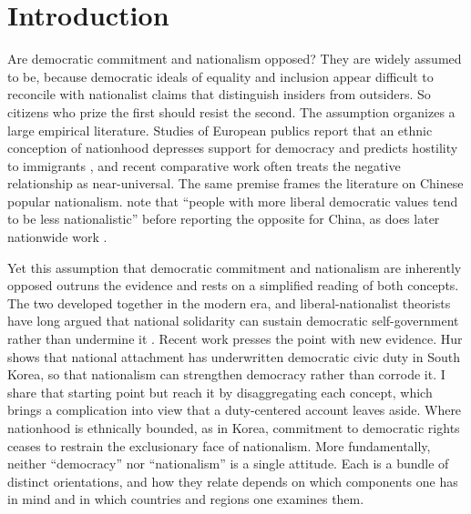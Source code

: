 \section{Introduction}\label{introduction}

Are democratic commitment and nationalism opposed? They are widely assumed to be, because democratic ideals of equality and inclusion appear difficult to reconcile with nationalist claims that distinguish insiders from outsiders. So citizens who prize the first should resist the second. The assumption organizes a large empirical literature. Studies of European publics report that an ethnic conception of nationhood depresses support for democracy \citep{gabrielsson2025} and predicts hostility to immigrants \citep{hjerm1998, pehrson2009}, and recent comparative work often treats the negative relationship as near-universal. The same premise frames the literature on Chinese popular nationalism. \citet[p.~62]{zhong2020} note that ``people with more liberal democratic values tend to be less nationalistic'' before reporting the opposite for China, as does later nationwide work \citep{liu2026}.

Yet this assumption that democratic commitment and nationalism are inherently opposed outruns the evidence and rests on a simplified reading of both concepts. The two developed together in the modern era, and liberal-nationalist theorists have long argued that national solidarity can sustain democratic self-government rather than undermine it \citep{tamir2019}. Recent work presses the point with new evidence. Hur \citeyearpar{hur2022narratives, hur2026democratic} shows that national attachment has underwritten democratic civic duty in South Korea, so that nationalism can strengthen democracy rather than corrode it. I share that starting point but reach it by disaggregating each concept, which brings a complication into view that a duty-centered account leaves aside. Where nationhood is ethnically bounded, as in Korea, commitment to democratic rights ceases to restrain the exclusionary face of nationalism. More fundamentally, neither ``democracy'' nor ``nationalism'' is a single attitude. Each is a bundle of distinct orientations, and how they relate depends on which components one has in mind and in which countries and regions one examines them.

